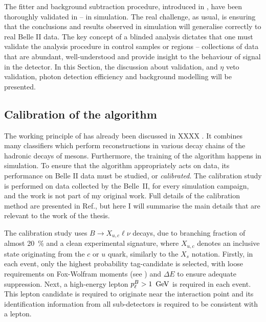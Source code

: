 The fitter and background subtraction procedure, introduced in ,
have been thoroughly validated in  -- in simulation.
The real challenge, as usual, is ensuring that the conclusions and results observed in simulation will generalise correctly to real Belle II data.
The key concept of a blinded analysis dictates that one must validate the analysis procedure in control samples or regions -- collections of data that are abundant, well-understood and provide insight to the behaviour of signal in the detector.
In this Section, the discussion about \FEI validation, \piz and $\eta$ veto validation, photon detection efficiency and background modelling will be presented.

\subsection{Calibration of the \texorpdfstring{\FEI}{FEI} algorithm}\label{sec:fei_calibration}

The working principle of \FEI has already been discussed in XXXX
.
It combines many classifiers which perform reconstructions in various decay chains of the hadronic decays of \B mesons.
Furthermore, the training of the algorithm happens in simulation.
To ensure that the algorithm appropriately acts on data, its performance on Belle II data must be studied, or \textit{calibrated}.
The calibration study is performed on data collected by the Belle~II, for every simulation campaign, and the work is not part of my original work.
Full details of the calibration method are presented in Ref.\cite{Belle-II:2020fst}, but here I will summarise the main details that are relevant to the work of the thesis.

The calibration study uses $B\rightarrow X_{u,c} \ell \nu$ decays, due to branching fraction of almost 20~\% and a clean experimental signature, 
where $X_{u,c}$ denotes an inclusive state originating from the $c$ or $u$ quark, similarly to the $X_s$ notation.
Firstly, in each event, only the highest \FEI probability tag-\B candidate is selected, with loose requirements on Fox-Wolfram moments (see ) and $\Delta E$ to ensure adequate \epem\ra\qqbar suppression.
Next, a high-energy lepton $p_{\ell}^B>1~\mathrm{\,Ge\kern -0.1em V}$ is required in each event.
This lepton candidate is required to originate near the interaction point and its identification information from all sub-detectors is required to be consistent with a lepton.

